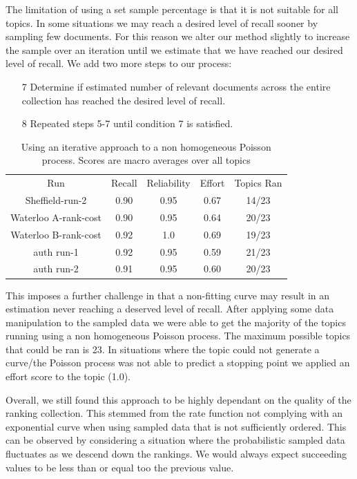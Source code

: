 The limitation of using a set sample percentage is that it is not suitable for all topics. In some situations we may reach a desired level of recall sooner by sampling few documents. For this reason we alter our method slightly to increase the sample over an iteration until we estimate that we have reached our desired level of recall. We add two more steps to our process:

\begin{enumerate}

\item[7] Determine if estimated number of relevant documents across the entire collection has reached the desired level of recall. 

\item[8] Repeated steps 5-7 until condition 7 is satisfied.

\end{enumerate}

\begin{table}[H]

\centering
\begin{tabular}{|c|c|c|c|c|} 
 \hline
 Run & Recall & Reliability & Effort & Topics Ran  \\ 
 Sheffield-run-2 & 0.90 & 0.95 & 0.67 & 14/23 \\
 Waterloo A-rank-cost & 0.90 & 0.95 & 0.64 & 20/23 \\
 Waterloo B-rank-cost & 0.92 & 1.0 & 0.69 & 19/23 \\
 auth run-1 & 0.92 & 0.95 & 0.59 & 21/23 \\
 auth run-2 & 0.91 & 0.95 & 0.60 & 20/23 \\
 \hline
\end{tabular}
\caption{Using an iterative approach to a non homogeneous Poisson process. Scores are macro averages over all topics}

\end{table}

This imposes a further challenge in that a non-fitting curve may result in an estimation never reaching a deserved level of recall. After applying some data manipulation to the sampled data we were able to get the majority of the topics running using a non homogeneous Poisson process. The maximum possible topics that could be ran is 23. In situations where the topic could not generate a curve/the Poisson process was not able to predict a stopping point we applied an effort score to the topic (1.0). 

Overall, we still found this approach to be highly dependant on the quality of the ranking collection. This stemmed from the rate function not complying with an exponential curve when using sampled data that is not sufficiently ordered. This can be observed by considering a situation where the probabilistic sampled data fluctuates as we descend down the rankings. We would always expect succeeding values to be less than or equal too the previous value.

